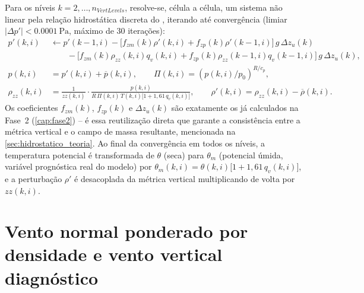Para os níveis $k=2,\dots,n_{VertLevels}$, resolve-se, célula a célula,
um sistema não linear pela relação hidrostática discreta do \mpasa{},
iterando até convergência (limiar $|\Delta p'| < \SI{0.0001}{\pascal}$,
máximo de 30 iterações):
\begin{align}
  p'(k,i) &\leftarrow p'(k{-}1,i) - \Big[f_{zm}(k)\rho'(k,i) + f_{zp}(k)\rho'(k{-}1,i)\Big]\,g\,\Delta z_u(k) \nonumber\\
  &\qquad - \Big[f_{zm}(k)\rho_{zz}(k,i)q_v(k,i) + f_{zp}(k)\rho_{zz}(k{-}1,i)q_v(k{-}1,i)\Big]\,g\,\Delta z_u(k), \label{eq:pp_iteracao}\\[0.4em]
  p(k,i) &= p'(k,i) + \overline{p}(k,i), \qquad
  \Pi(k,i) = \left(p(k,i)/p_0\right)^{R/c_p}, \label{eq:p_iteracao}\\[0.4em]
  \rho_{zz}(k,i) &= \frac{1}{zz(k,i)}\cdot\frac{p(k,i)}{R\,\Pi(k,i)\,T(k,i)\big[1+1{,}61\,q_v(k,i)\big]},
  \qquad
  \rho'(k,i) = \rho_{zz}(k,i)-\overline{\rho}(k,i). \label{eq:rho_iteracao}
\end{align}
Os coeficientes $f_{zm}(k)$, $f_{zp}(k)$ e $\Delta z_u(k)$ são exatamente
os já calculados na Fase~2 (\cref{cap:fase2}) -- é essa reutilização
direta que garante a consistência entre a métrica vertical e o campo de
massa resultante, mencionada na \cref{sec:hidrostatico_teoria}. Ao final
da convergência em todos os níveis, a temperatura potencial é
transformada de $\theta$ (seca) para $\theta_m$ (potencial úmida,
variável prognóstica real do modelo) por
$\theta_m(k,i) = \theta(k,i)\big[1+1{,}61\,q_v(k,i)\big]$, e a
perturbação $\rho'$ é desacoplada da métrica vertical multiplicando de
volta por $zz(k,i)$.

\section{Vento normal ponderado por densidade e vento vertical diagnóstico}

